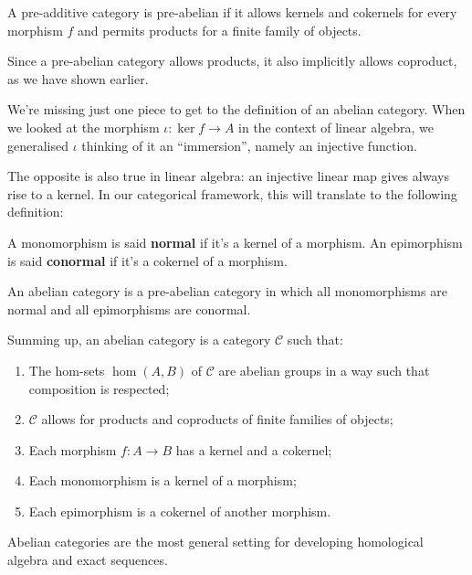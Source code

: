 \documentclass{beamer}
\begin{document}
\begin{frame}
    \begin{definition}
        A pre-additive category is pre-abelian if it allows kernels and cokernels for
        every morphism $f$ and permits products for a finite family of objects.
    \end{definition}

    Since a pre-abelian category allows products, it also implicitly allows
    coproduct, as we have shown earlier.
\end{frame}

\begin{frame}
    We're missing just one piece to get to the definition of an abelian category.
    When we looked at the morphism $\iota : \ker f \to A$ in the context of linear
    algebra, we generalised $\iota$ thinking of it an ``immersion'', namely an
    injective function. \medskip

    The opposite is also true in linear algebra: an injective linear map gives always rise
    to a kernel. In our categorical framework, this will translate to the following
    definition:

    \begin{definition}
        A monomorphism is said \textbf{normal} if it's a kernel of a morphism.
        An epimorphism is said \textbf{conormal} if it's a cokernel of a morphism.
    \end{definition}
\end{frame}

\begin{frame}
    \begin{definition}
        An abelian category is a pre-abelian category in which all monomorphisms are normal
        and all epimorphisms are conormal.
    \end{definition}

    Summing up, an abelian category is a category $\mathcal{C}$ such that:
    \begin{enumerate}
        \item The hom-sets $\hom(A, B)$ of $\mathcal{C}$ are abelian groups in a way such that
            composition is respected;
        \item $\mathcal{C}$ allows for products and coproducts of finite families of objects;
        \item Each morphism $f : A \to B$ has a kernel and a cokernel;
        \item Each monomorphism is a kernel of a morphism;
        \item Each epimorphism is a cokernel of another morphism.
    \end{enumerate}
\end{frame}

\begin{frame}
    Abelian categories are the most general setting for developing homological
    algebra and exact sequences.
\end{frame}
\end{document}
